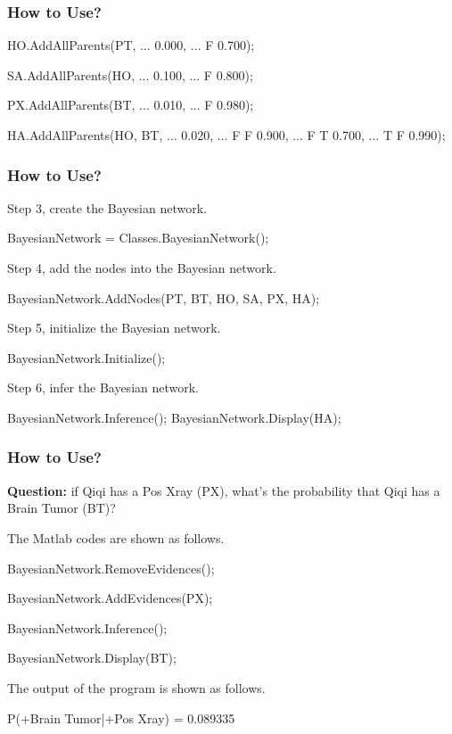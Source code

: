 \documentclass[10pt]{beamer}
\begin{document}
\begin{frame}[fragile]
\frametitle{How to Use?}
\begin{bash}[name=BayesianNetwork]
HO.AddAllParents(PT, ...
    0.000, ...    F
    0.700);  %

SA.AddAllParents(HO, ...
    0.100, ...    F
    0.800);  %

PX.AddAllParents(BT, ...
    0.010, ...    F
    0.980);  %

HA.AddAllParents(HO, BT, ...
    0.020, ...    F   F
    0.900, ...    F   T
    0.700, ...    T   F
    0.990);  %
\end{bash}
\end{frame}

\begin{frame}[fragile]
\frametitle{How to Use?}
Step 3, create the Bayesian network.
\begin{bash}[name=BayesianNetwork]
BayesianNetwork = Classes.BayesianNetwork();
\end{bash}

Step 4, add the nodes into the Bayesian network.
\begin{bash}[name=BayesianNetwork]
BayesianNetwork.AddNodes(PT, BT, HO, SA, PX, HA);
\end{bash}

Step 5, initialize the Bayesian network.
\begin{bash}[name=BayesianNetwork]
BayesianNetwork.Initialize();
\end{bash}

Step 6, infer the Bayesian network.
\begin{bash}[name=BayesianNetwork]
BayesianNetwork.Inference();
BayesianNetwork.Display(HA);
\end{bash}
\end{frame}

\begin{frame}[fragile]
\frametitle{How to Use?}
\textbf{Question:} if Qiqi has a Pos Xray (PX), what's the probability that Qiqi has a Brain Tumor (BT)?

The Matlab codes are shown as follows.
\begin{bash}[name=BayesianNetwork]
BayesianNetwork.RemoveEvidences();

BayesianNetwork.AddEvidences(PX);

BayesianNetwork.Inference();

BayesianNetwork.Display(BT);
\end{bash}

The output of the program is shown as follows.
\begin{bash}
P(+Brain Tumor|+Pos Xray) = 0.089335
\end{bash}

\end{frame}
\end{document}
